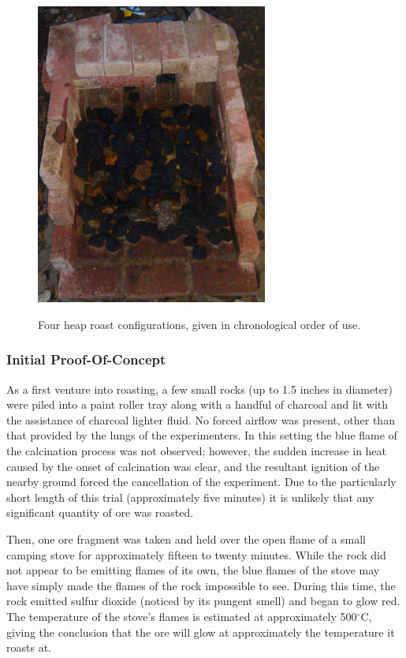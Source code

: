 \begin{figure}[htb]
{\includegraphics[width=3in]{images/2012.07.05_fourth_heap_roast/fourth_roast_setup.jpg}
\label{fig:heaproast-d}
}

\caption{Four heap roast configurations, given in chronological order of use.}
\label{fig:heaproast}
\end{figure}

\subsubsection{Initial Proof-Of-Concept}

As a first venture into roasting, a few small rocks (up to 1.5 inches in
diameter) were piled into a paint roller tray along with a handful of charcoal
and lit with the assistance of charcoal lighter fluid.  No forced airflow was
present, other than that provided by the lungs of the experimenters.  In this
setting the blue flame of the calcination process was not observed; however, the
sudden increase in heat caused by the onset of calcination was clear, and the
resultant ignition of the nearby ground forced the cancellation of the
experiment.  Due to the particularly short length of this trial (approximately
five minutes) it is unlikely that any significant quantity of ore was roasted.

Then, one ore fragment was taken and held over the open flame of a small camping
stove for approximately fifteen to twenty minutes.  While the rock did not
appear to be emitting flames of its own, the blue flames of the stove may have
simply made the flames of the rock impossible to see.  During this time, the
rock emitted sulfur dioxide (noticed by its pungent smell) and began to glow
red.  The temperature of the stove's flames is estimated at approximately
500$^\circ$C, giving the conclusion that the ore will glow at approximately the
temperature it roasts at.

